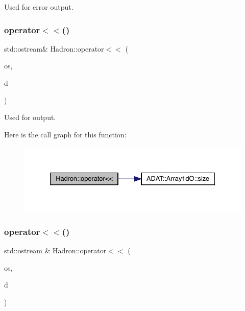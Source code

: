 Used for error output. 

\mbox{\label{namespaceHadron_ae9b46ddd0929bce6b0f65be81daed91a}} 
\subsubsection{\texorpdfstring{operator$<$$<$()}{operator<<()}\hspace{0.1cm}{\footnotesize\ttfamily [29/48]}}
{\footnotesize\ttfamily std\+::ostream\& Hadron\+::operator$<$$<$ (\begin{DoxyParamCaption}\item[{std\+::ostream \&}]{os,  }\item[{const \mbox{\hyperlink{classADAT_1_1Array1dO}{Array1dO}}$<$ \mbox{\hyperlink{structHadron_1_1KeyHadronSUNNPartIrrepOp__t_1_1CGPair__t}{Key\+Hadron\+S\+U\+N\+N\+Part\+Irrep\+Op\+\_\+t\+::\+C\+G\+Pair\+\_\+t}} $>$ \&}]{d }\end{DoxyParamCaption})}



Used for output. 

Here is the call graph for this function\+:\nopagebreak
\begin{figure}[H]
\begin{center}
\leavevmode
\includegraphics[width=332pt]{d1/daf/namespaceHadron_ae9b46ddd0929bce6b0f65be81daed91a_cgraph}
\end{center}
\end{figure}
\mbox{\label{namespaceHadron_a6447e57d6b19af925c635187757e2f02}} 
\subsubsection{\texorpdfstring{operator$<$$<$()}{operator<<()}\hspace{0.1cm}{\footnotesize\ttfamily [30/48]}}
{\footnotesize\ttfamily std\+::ostream \& Hadron\+::operator$<$$<$ (\begin{DoxyParamCaption}\item[{std\+::ostream \&}]{os,  }\item[{const \mbox{\hyperlink{structHadron_1_1KeyHadronNPartNPtConnGraph__t}{Key\+Hadron\+N\+Part\+N\+Pt\+Conn\+Graph\+\_\+t}} \&}]{d }\end{DoxyParamCaption})}



